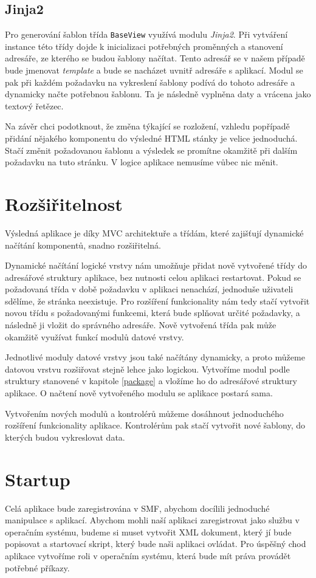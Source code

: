     \subsection{Jinja2}
    Pro generování šablon třída \verb|BaseView| využívá modulu \emph{Jinja2}. Při vytváření instance této třídy dojde k inicializaci potřebných proměnných a stanovení adresáře, ze kterého se budou šablony načítat. Tento adresář se v našem případě bude jmenovat \emph{template} a bude se nacházet uvnitř adresáře s aplikací. Modul se pak při každém požadavku na vykreslení šablony podívá do tohoto adresáře a dynamicky načte potřebnou šablonu. Ta je následně vyplněna daty a vrácena jako textový řetězec.

    Na závěr chci podotknout, že změna týkající se rozložení, vzhledu popřípadě přidání nějakého komponentu do výsledné HTML stánky je velice jednoduchá. Stačí změnit požadovanou šablonu a výsledek se promítne okamžitě při dalším požadavku na tuto stránku. V logice aplikace nemusíme vůbec nic měnit.

\section{Rozšiřitelnost}
Výsledná aplikace je díky MVC architektuře a třídám, které zajišťují dynamické načítání komponentů, snadno rozšiřitelná.

Dynamické načítání logické vrstvy nám umožňuje přidat nově vytvořené třídy do adresářové struktury aplikace, bez nutnosti celou aplikaci restartovat. Pokud se požadovaná třída v době požadavku v aplikaci nenachází, jednoduše uživateli sdělíme, že stránka neexistuje. Pro rozšíření funkcionality nám tedy stačí vytvořit novou třídu s požadovanými funkcemi, která bude splňovat určité požadavky, a následně ji vložit do správného adresáře. Nově vytvořená třída pak může okamžitě využívat funkcí modulů datové vrstvy. 

Jednotlivé moduly datové vrstvy jsou také načítány dynamicky, a proto můžeme datovou vrstvu rozšiřovat stejně lehce jako logickou. Vytvoříme modul podle struktury stanovené v kapitole \ref{package} a vložíme ho do adresářové struktury aplikace. O načtení nově vytvořeného modulu se aplikace postará sama.

Vytvořením nových modulů a kontrolérů můžeme dosáhnout jednoduchého rozšíření funkcionality aplikace. Kontrolérům pak stačí vytvořit nové šablony, do kterých budou vykreslovat data. 

\section{Startup}
Celá aplikace bude zaregistrována v SMF, abychom docílili jednoduché manipulace s aplikací. Abychom mohli naší aplikaci zaregistrovat jako službu v operačním systému, budeme si muset vytvořit XML dokument, který jí bude popisovat a startovací skript, který bude naši aplikaci ovládat. Pro úspěšný chod aplikace vytvoříme roli v operačním systému, která bude mít práva provádět potřebné příkazy.
